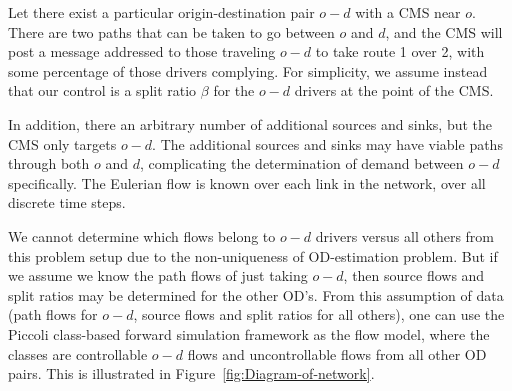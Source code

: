 Let there exist a particular origin-destination pair $o-d$ with a
CMS near $o$. There are two paths that can be taken to go between
$o$ and $d$, and the CMS will post a message addressed to those
traveling $o-d$ to take route 1 over 2, with some percentage of those drivers complying. For simplicity, we assume instead that our control is a split
ratio $\beta$ for the $o-d$ drivers at the point of the CMS.

In addition, there an arbitrary
number of additional sources and sinks, but the CMS only targets $o-d$.
The additional sources and sinks may have viable paths through both
$o$ and $d$, complicating the determination of demand between $o-d$
specifically. The Eulerian flow is known over each link in the network,
over all discrete time steps.

We cannot determine which flows belong to $o-d$ drivers versus all
others from this problem setup due to the non-uniqueness of OD-estimation
problem. But if we assume we know the path flows of just taking $o-d$,
then source flows and split ratios may be determined for the other
OD's. From this assumption of data (path flows for $o-d$, source
flows and split ratios for all others), one can use the Piccoli class-based
forward simulation framework as the flow model, where the classes
are controllable $o-d$ flows and uncontrollable flows from all other
OD pairs. This is illustrated in Figure~\ref{fig:Diagram-of-network}.
